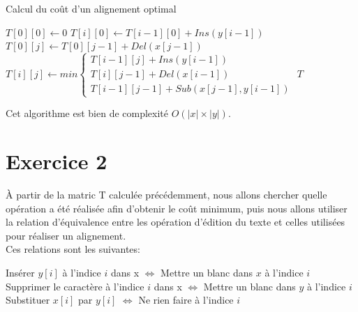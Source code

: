 \documentclass{article}
\begin{document}
\begin{algorithm}
\caption{Calcul du coût d'un alignement optimal}\label{algo:cout}
\begin{algorithmic}[1]
	\State $T[0][0] \gets 0 $
		\State $T[i][0] \gets T[i-1][0] + Ins(y[i-1])$
	\EndFor
		\State $T[0][j] \gets T[0][j-1] + Del(x[j-1])$
	\EndFor
			\State $T[i][j] \gets min\begin{cases}
							T[i-1][j] + Ins(y[i-1])\\
							T[i][j-1] + Del(x[i-1])\\
							T[i-1][j-1] + Sub(x[j-1],y[i-1])
							\end{cases}$
		\EndFor
	\EndFor
	\State \Return $T$	
\EndProcedure
\end{algorithmic}
\end{algorithm}
Cet algorithme est bien de complexité $O(\lvert x\rvert \times \lvert y\rvert)$.
 

\section{Exercice 2}


À partir de la matric T calculée précédemment, nous allons chercher quelle
opération a été réalisée afin d'obtenir le coût minimum, puis nous allons
utiliser la relation d'équivalence entre les opération d'édition du texte et
celles utilisées pour réaliser un alignement.\\
Ces relations sont les suivantes:
\begin{center}
	Insérer $y[i]$ à l'indice $i$ dans x  $\Leftrightarrow$ Mettre un blanc dans $x$ à l'indice $i$ \\
	Supprimer le caractère à l'indice $i$ dans x $\Leftrightarrow$ Mettre un blanc dans $y$ à l'indice $i$\\
	Substituer $x[i]$ par $y[i]$ $\Leftrightarrow$ Ne rien faire à l'indice $i$ 
\end{center}
\end{document}
